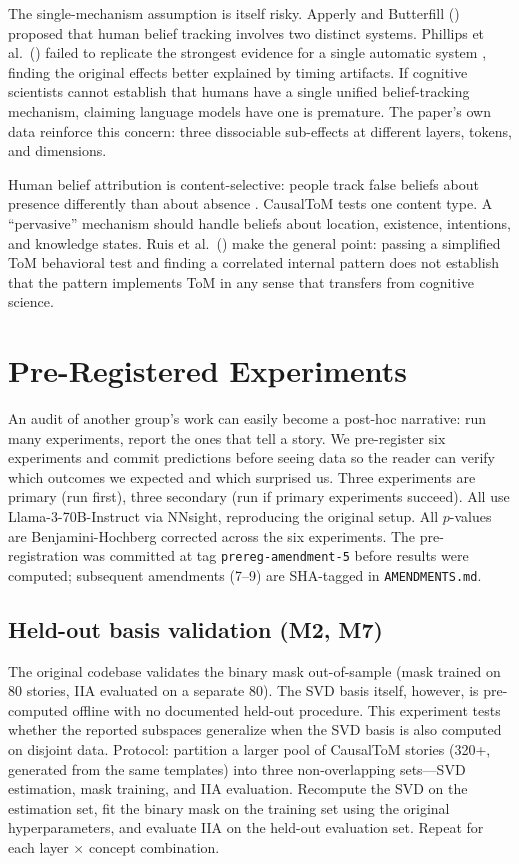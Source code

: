 \documentclass{article}
\begin{document}
The single-mechanism assumption is itself risky. Apperly and Butterfill (\citeyear{apperly2009humans}) proposed that human belief tracking involves two distinct systems. Phillips et al.\ (\citeyear{phillips2015second}) failed to replicate the strongest evidence for a single automatic system \citep{kovacs2010social}, finding the original effects better explained by timing artifacts. If cognitive scientists cannot establish that humans have a single unified belief-tracking mechanism, claiming language models have one is premature. The paper's own data reinforce this concern: three dissociable sub-effects at different layers, tokens, and dimensions.

Human belief attribution is content-selective: people track false beliefs about presence differently than about absence \citep{schuwerk2015implicit}. CausalToM tests one content type. A ``pervasive'' mechanism should handle beliefs about location, existence, intentions, and knowledge states. Ruis et al.\ (\citeyear{ruis2025reevaluating}) make the general point: passing a simplified ToM behavioral test and finding a correlated internal pattern does not establish that the pattern implements ToM in any sense that transfers from cognitive science.


\section{Pre-Registered Experiments}
\label{sec:experiments}

An audit of another group's work can easily become a post-hoc narrative: run many experiments, report the ones that tell a story. We pre-register six experiments and commit predictions before seeing data so the reader can verify which outcomes we expected and which surprised us. Three experiments are primary (run first), three secondary (run if primary experiments succeed). All use Llama-3-70B-Instruct via NNsight, reproducing the original setup. All $p$-values are Benjamini-Hochberg corrected across the six experiments. The pre-registration was committed at tag \texttt{prereg-amendment-5} before results were computed; subsequent amendments (7--9) are SHA-tagged in \texttt{AMENDMENTS.md}.

\subsection{Held-out basis validation (M2, M7)}

The original codebase validates the binary mask out-of-sample (mask trained on 80 stories, IIA evaluated on a separate 80). The SVD basis itself, however, is pre-computed offline with no documented held-out procedure. This experiment tests whether the reported subspaces generalize when the SVD basis is also computed on disjoint data. Protocol: partition a larger pool of CausalToM stories (320+, generated from the same templates) into three non-overlapping sets---SVD estimation, mask training, and IIA evaluation. Recompute the SVD on the estimation set, fit the binary mask on the training set using the original hyperparameters, and evaluate IIA on the held-out evaluation set. Repeat for each layer $\times$ concept combination.
\end{document}
